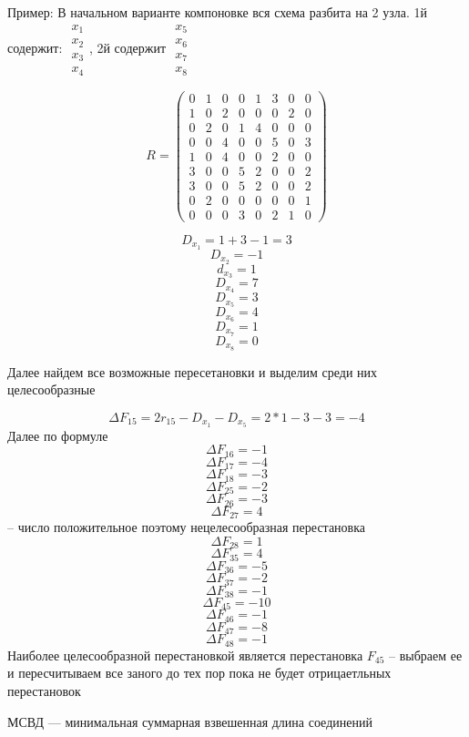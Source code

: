 \documentclass{article}
\begin{document}
	Пример:
	В начальном варианте компоновке вся схема разбита на 2 узла. 1й содержит: $ \begin{array}{c}
		x_1 \\ x_2 \\ x_3 \\ x_4	
	\end{array}$, 2й содержит $ \begin{array}{c}
		x_5 \\ x_6 \\ x_7 \\ x_8
	\end{array}$
	
	$$
	R = 
	\begin{pmatrix}
		0 & 1 & 0 & 0 & 1 & 3 & 0 & 0\\
		1 & 0 & 2 & 0 & 0 & 0 & 2 & 0\\
		0 & 2 & 0 & 1 & 4 & 0 & 0 & 0\\
		0 & 0 & 4 & 0 & 0 & 5 & 0 & 3\\
		1 & 0 & 4 & 0 & 0 & 2 & 0 & 0\\
		3 & 0 & 0 & 5 & 2 & 0 & 0 & 2\\
		3 & 0 & 0 & 5 & 2 & 0 & 0 & 2\\
		0 & 2 & 0 & 0 & 0 & 0 & 0 & 1\\
		0 & 0 & 0 & 3 & 0 & 2 & 1 & 0
	\end{pmatrix}
	$$


	$$
	D_{x_1} = 1 + 3 - 1 = 3
	$$
	$$
	D_{x_2} = -1
	$$
	$$
	d_{x_3} = 1
	$$
	$$
	D_{x_4} = 7
	$$
	$$
	D_{x_5} = 3
	$$
	$$
	D_{x_6} = 4
	$$
	$$
	D_{x_7} = 1
	$$
	$$
	D_{x_8} = 0
	$$

	Далее найдем все возможные пересетановки и выделим среди них целесообразные

	$$
	\Delta F_{15} = 2 r_{15} - D_{x_1} - D_{x_5} = 2 * 1 - 3 - 3 = -4
	$$
	Далее по формуле
	$$
	\Delta F_{16} = -1
	$$
	$$
	\Delta F_{17} = -4
	$$
	$$
	\Delta F_{18} = -3
	$$
	$$
	\Delta F_{25} = -2
	$$
	$$
	\Delta F_{26} = -3
	$$
	$$
	\Delta F_{27} = 4
	$$ -- число положительное поэтому нецелесообразная перестановка
	$$
	\Delta F_{28} = 1
	$$
	$$
	\Delta F_{35} = 4
	$$
	$$
	\Delta F_{36} = -5
	$$
	$$
	\Delta F_{37} = -2
	$$
	$$
	\Delta F_{38} = -1
	$$
	$$
	\Delta F_{45} = -10
	$$
	$$
	\Delta F_{46} = -1
	$$
	$$
	\Delta F_{47} = -8
	$$
	$$
	\Delta F_{48} = -1
	$$
	Наиболее целесообразной перестановкой является перестановка $F_{45}$ -- выбраем ее и пересчитываем все заного до тех пор пока не будет отрицаетльных перестановок

	МСВД --- минимальная суммарная взвешенная длина соединений
\end{document}
